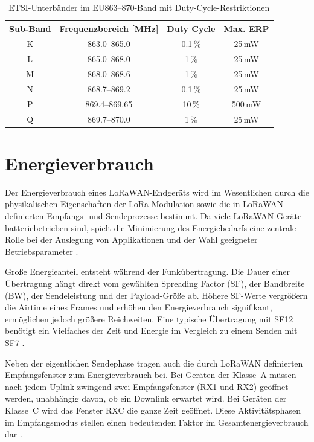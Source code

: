 	
	\begin{table}[H]
		\centering
		\begin{tabular}{|c|c|c|c|}
			\hline
			\textbf{Sub-Band} & \textbf{Frequenzbereich [MHz]} & \textbf{Duty Cycle} & \textbf{Max. ERP} \\
			\hline
			K & 863.0--865.0   & 0.1\,\%  & 25\,mW \\
			\hline
			L & 865.0--868.0   & 1\,\%    & 25\,mW \\
			\hline
			M & 868.0--868.6   & 1\,\%    & 25\,mW \\
			\hline
			N & 868.7--869.2   & 0.1\,\%  & 25\,mW \\
			\hline
			P & 869.4--869.65  & 10\,\%   & 500\,mW \\
			\hline
			Q & 869.7--870.0   & 1\,\%    & 25\,mW \\
			\hline
		\end{tabular}
		\caption{ETSI-Unterbänder im EU863--870-Band mit Duty-Cycle-Restriktionen 
			\cite{ETSI:2018b}}
	\end{table}
	
\section{Energieverbrauch}
	Der Energieverbrauch eines LoRaWAN-Endgeräts wird im Wesentlichen durch die physikalischen Eigenschaften der LoRa-Modulation sowie die in LoRaWAN definierten Empfangs- und Sendeprozesse bestimmt. Da viele LoRaWAN-Geräte batteriebetrieben sind, spielt die Minimierung des Energiebedarfs eine zentrale Rolle bei der Auslegung von Applikationen und der Wahl geeigneter Betriebsparameter \cite{Montagny:2022}.

	Gro{\ss}e Energieanteil entsteht während der Funkübertragung. Die Dauer einer Übertragung hängt direkt vom gewählten Spreading Factor (SF), der Bandbreite (BW), der Sendeleistung und der Payload-Grö{\ss}e ab. Höhere SF-Werte vergrö{\ss}ern die Airtime eines Frames und erhöhen den Energieverbrauch signifikant, ermöglichen jedoch grö{\ss}ere Reichweiten. Eine typische Übertragung mit SF12 benötigt ein Vielfaches der Zeit und Energie im Vergleich zu einem Senden mit SF7 \cite{ETSI:2018} \cite{Montagny:2022}.

	Neben der eigentlichen Sendephase tragen auch die durch LoRaWAN definierten Empfangsfenster zum Energieverbrauch bei. Bei Geräten der Klasse~A müssen nach jedem Uplink zwingend zwei Empfangsfenster (RX1 und RX2) geöffnet werden, unabhängig davon, ob ein Downlink erwartet wird. Bei Geräten der Klasse~C wird das Fenster RXC die ganze Zeit geöffnet. Diese Aktivitätsphasen im Empfangsmodus stellen einen bedeutenden Faktor im Gesamtenergieverbrauch dar \cite{LoRaAlliance:2020b}.

